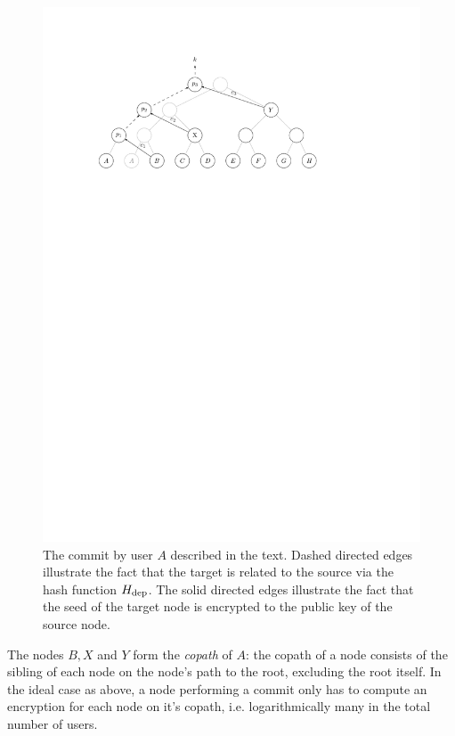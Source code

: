 \begin{figure}
	\begin{center}
		\includegraphics{figures/treekem-simple-update}
	\end{center}
	\caption{The commit by user $A$ described in the text. Dashed directed edges illustrate the fact that the target is related to the source via the hash function $H_\mathrm{dep}$. The solid directed edges illustrate the fact that the seed of the target node is encrypted to the public key of the source node.}\label{fig:treekem-simple-update}
\end{figure}

The nodes $B, X$ and $Y$ form the \emph{copath} of $A$: the copath of a node consists of the sibling of each node on the node's path to the root, excluding the root itself. In the ideal case as above, a node performing a commit only has to compute an encryption for each node on it's copath, i.e. logarithmically many in the total number of users.

